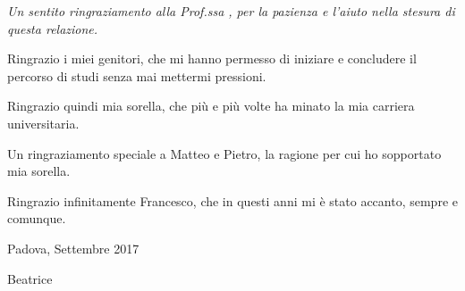 
\begin{acknowledgements}
\vspace{0.5cm}
\itshape
Un sentito ringraziamento alla Prof.ssa \supname, per la pazienza e l'aiuto nella stesura di questa relazione.

Ringrazio i miei genitori, che mi hanno permesso di iniziare e concludere il percorso di studi senza mai mettermi pressioni.

Ringrazio quindi mia sorella, che più e più volte ha minato la mia carriera universitaria.

Un ringraziamento speciale a Matteo e Pietro, la ragione per cui ho sopportato mia sorella.

Ringrazio infinitamente Francesco, che in questi anni mi è stato accanto, sempre e comunque.

\vspace{1cm}
\begin{minipage}[t]{0.49\textwidth}
	\begin{flushleft}
		Padova, Settembre 2017
	\end{flushleft}
\end{minipage}
%
\begin{minipage}[t]{0.49\textwidth}
	\begin{flushright}
		Beatrice
	\end{flushright}
\end{minipage}

\end{acknowledgements}
